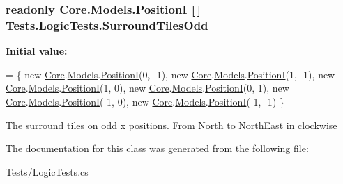 \subsubsection[{Surround\+Tiles\+Odd}]{\setlength{\rightskip}{0pt plus 5cm}readonly {\bf Core.\+Models.\+Position\+I} \mbox{[}$\,$\mbox{]} Tests.\+Logic\+Tests.\+Surround\+Tiles\+Odd\hspace{0.3cm}{\ttfamily [static]}}\label{classTests_1_1LogicTests_af254999d6b4e9ce25e101b28d71292ab}
{\bfseries Initial value\+:}
\begin{DoxyCode}
=
            \{
                \textcolor{keyword}{new} \hyperlink{namespaceCore}{Core}.\hyperlink{namespaceCore_1_1Models}{Models}.\hyperlink{classCore_1_1Models_1_1PositionI}{PositionI}(0, -1),
                \textcolor{keyword}{new} \hyperlink{namespaceCore}{Core}.\hyperlink{namespaceCore_1_1Models}{Models}.\hyperlink{classCore_1_1Models_1_1PositionI}{PositionI}(1, -1),
                \textcolor{keyword}{new} \hyperlink{namespaceCore}{Core}.\hyperlink{namespaceCore_1_1Models}{Models}.\hyperlink{classCore_1_1Models_1_1PositionI}{PositionI}(1, 0),
                \textcolor{keyword}{new} \hyperlink{namespaceCore}{Core}.\hyperlink{namespaceCore_1_1Models}{Models}.\hyperlink{classCore_1_1Models_1_1PositionI}{PositionI}(0, 1),
                \textcolor{keyword}{new} \hyperlink{namespaceCore}{Core}.\hyperlink{namespaceCore_1_1Models}{Models}.\hyperlink{classCore_1_1Models_1_1PositionI}{PositionI}(-1, 0),
                \textcolor{keyword}{new} \hyperlink{namespaceCore}{Core}.\hyperlink{namespaceCore_1_1Models}{Models}.\hyperlink{classCore_1_1Models_1_1PositionI}{PositionI}(-1, -1)
            \}
\end{DoxyCode}


The surround tiles on odd x positions. From North to North\+East in clockwise 



The documentation for this class was generated from the following file\+:\begin{DoxyCompactItemize}
\item 
Tests/Logic\+Tests.\+cs\end{DoxyCompactItemize}
